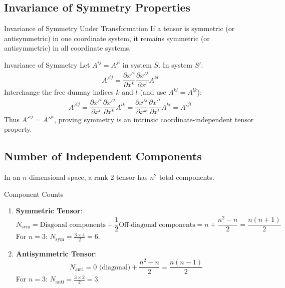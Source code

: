 \documentclass[11pt,a4paper]{article}
\begin{document}
\subsection{Invariance of Symmetry Properties}
\begin{theorembox}{Invariance of Symmetry Under Transformation}
If a tensor is symmetric (or antisymmetric) in one coordinate system, it remains symmetric (or antisymmetric) in all coordinate systems.
\end{theorembox}
\begin{proofbox}{Invariance of Symmetry}
Let $A^{ij} = A^{ji}$ in system $S$. In system $S'$:
\[
A'^{ij} = \frac{\partial x'^i}{\partial x^k} \frac{\partial x'^j}{\partial x^l} A^{kl}
\]
Interchange the free dummy indices $k$ and $l$ (and use $A^{kl} = A^{lk}$):
\[
A'^{ij} = \frac{\partial x'^i}{\partial x^l} \frac{\partial x'^j}{\partial x^k} A^{lk} = \frac{\partial x'^j}{\partial x^k} \frac{\partial x'^i}{\partial x^l} A^{kl} = A'^{ji}
\]
Thus $A'^{ij} = A'^{ji}$, proving symmetry is an intrinsic coordinate-independent tensor property.
\end{proofbox}

\subsection{Number of Independent Components}
In an $n$-dimensional space, a rank 2 tensor has $n^2$ total components.
\begin{importantbox}{Component Counts}
\begin{enumerate}
    \item \textbf{Symmetric Tensor}:
    \[
    N_{\text{sym}} = \text{Diagonal components} + \frac{1}{2}\text{Off-diagonal components} = n + \frac{n^2 - n}{2} = \frac{n(n+1)}{2}
    \]
    For $n=3$: $N_{\text{sym}} = \frac{3 \times 4}{2} = 6$.
    \item \textbf{Antisymmetric Tensor}:
    \[
    N_{\text{anti}} = 0 \text{ (diagonal)} + \frac{n^2 - n}{2} = \frac{n(n-1)}{2}
    \]
    For $n=3$: $N_{\text{anti}} = \frac{3 \times 2}{2} = 3$.
\end{enumerate}
\end{importantbox}
\end{document}
